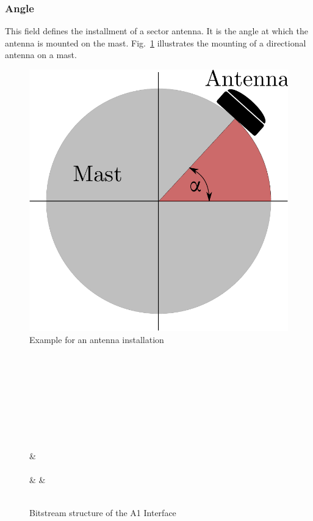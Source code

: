 \documentclass[master,english]{hgbthesis}
\begin{document}
\subsubsection{Angle}
This field defines the installment of a sector antenna. It is the angle at which the antenna is mounted on the mast. Fig.~\ref{fig:antennaangle} illustrates the mounting of a directional antenna on a mast.
% 
\begin{figure}
	\centering
	\includegraphics[width=0.4\linewidth]{./images/antennaangle}
	\caption{Example for an antenna installation} 
	\label{fig:antennaangle}
\end{figure}
\begin{figure}
	\begin{bytefield}[bitwidth=1.1em]{32}
		 \\
		 \\ 
		\skippedwords\\
		\\
		 \\
		 \\
		 \\
		 \\
		&\\
		\\
		& &  \\
		\\
	\end{bytefield}
	\caption{Bitstream structure of the A1 Interface}
	\label{fig:a1structure}
\end{figure}
\end{document}
